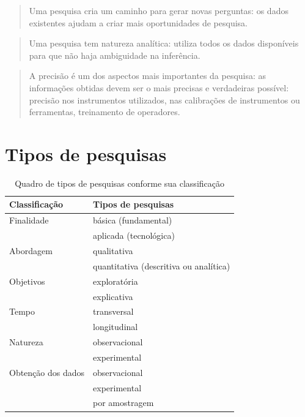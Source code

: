 \documentclass[
]{book}
\begin{document}
\hfill\break

\begin{quote}
Uma pesquisa cria um caminho para gerar novas perguntas: os dados existentes ajudam a criar mais oportunidades de pesquisa.
\end{quote}

\hfill\break

\begin{quote}
Uma pesquisa tem natureza analítica: utiliza todos os dados disponíveis para que não haja ambiguidade na inferência.
\end{quote}

\hfill\break

\begin{quote}
A precisão é um dos aspectos mais importantes da pesquisa: as informações obtidas devem ser o mais precisas e verdadeiras possível: precisão nos instrumentos utilizados, nas calibrações de instrumentos ou ferramentas, treinamento de operadores.
\end{quote}

\hypertarget{tipos-de-pesquisas}{%
\section{Tipos de pesquisas}\label{tipos-de-pesquisas}}

\hfill\break

\begin{table}[h]
\centering
\caption{Quadro de tipos de pesquisas conforme sua classificação}
\begin{tabular}{|l|l|}
\hline 
\textbf{Classificação} & \textbf{Tipos de pesquisas}  \\ 
\hline 
Finalidade & básica (fundamental)   \\
           & aplicada (tecnológica) \\
\hline 
Abordagem  & qualitativa \\
           & quantitativa (descritiva ou analítica)\\
\hline 
Objetivos & exploratória \\
          & explicativa \\
\hline 
Tempo & transversal \\
      & longitudinal \\
\hline 
Natureza & observacional \\
         & experimental \\
\hline 
Obtenção dos dados & observacional \\
                    & experimental \\
                    & por amostragem \\

\hline 
\end{tabular} 
\end{table}
\end{document}
